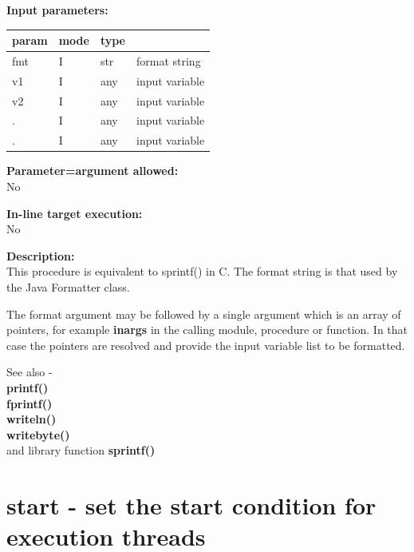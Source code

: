         {\bf Input parameters:} \\
        \begin{tabular}{| l | l | l | l |}
        \hline
        param  & mode     & type  & \\
        \hline \hline
        fmt  & I & str  & format string   \\ \hline
        v1   & I & any  & input variable  \\ \hline
        v2   & I & any  & input variable  \\ \hline
        .    & I & any  & input variable  \\ \hline
        .    & I & any  & input variable  \\ \hline
        \end{tabular}
        
        {\bf Parameter=argument allowed:} \\
        No
        
        {\bf In-line target execution:} \\
        No
        
        {\bf Description:} \\
        This procedure is equivalent to sprintf() in C. The format string is that used
        by the Java Formatter class.        
        
        The format argument may be followed by a single argument which is an array of
        pointers, for example {\bf inargs} in the calling module, procedure or function.
        In that case the pointers are resolved and provide the input variable list to be
        formatted.
        
        See also - \\
        {\bf printf()}  \\
        {\bf fprintf()}  \\
        {\bf writeln()}  \\
        {\bf writebyte()}  \\
        and library function {\bf sprintf()}  \\





    \section{start - set the start condition for execution threads}\label{sec:ipstart}
        
